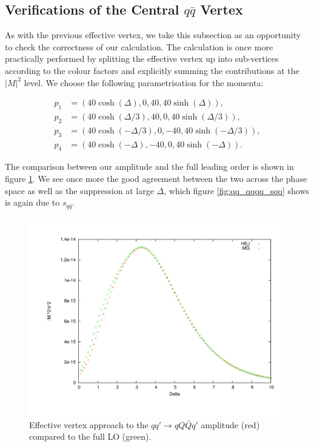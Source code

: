 \subsection{Verifications of the Central $q\bar{q}$ Vertex}

As with the previous effective vertex, we take this subsection as an opportunity to check the correctness of our calculation. The calculation is once more practically performed by splitting the effective vertex up into sub-vertices according to the colour factors and explicitly summing the contributions at the $|M|^2$ level. We choose the following parametrisation for the momenta: 

\begin{equation}
\begin{split}
p_1 & = (40 \cosh(\Delta), 0, 40, 40 \sinh(\Delta)), \\
p_2 & = (40 \cosh(\Delta/3), 40, 0, 40 \sinh(\Delta/3)), \\
p_3 & = (40 \cosh(-\Delta/3), 0, -40, 40 \sinh(-\Delta/3)), \\
p_4 & = (40 \cosh(-\Delta), -40, 0, 40 \sinh(-\Delta)). 
\end{split}
\label{eqn:4jetmom}
\end{equation}

The comparison between our amplitude and the full leading order is shown in figure \ref{fig:qq_qqqq}. We see once more the good agreement between the two across the phase space as well as the suppression at large $\Delta$, which figure \ref{fig:qq_qqqq_sqq} shows is again due to $s_{q \bar{q}}$. 

\begin{figure}[H]
\centering
\includegraphics[scale=0.45]{Images/qQ_qqqxQ.pdf}
\caption{Effective vertex approach to the $qq' \to qQ\bar{Q}q'$ amplitude (red) compared to the full LO (green).}
\label{fig:qq_qqqq}
\end{figure}

